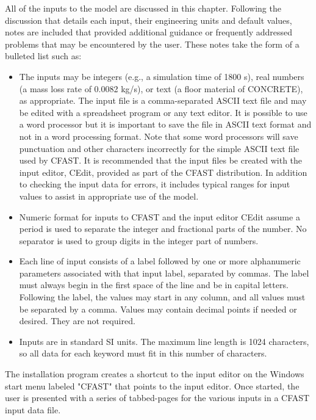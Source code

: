 All of the inputs to the model are discussed in this chapter.  Following the discussion that details each input, their engineering units and default values, notes are included that provided additional guidance or frequently addressed problems that may be encountered by the user. These notes take the form of a bulleted list such as:

\begin{itemize}
\item The inputs may be integers (e.g., a simulation time of 1800 s), real numbers (a mass loss rate of 0.0082 kg/s), or text (a floor material of CONCRETE), as appropriate. The input file is a comma-separated ASCII text file and may be edited with a spreadsheet program or any text editor. It is possible to use a word processor but it is important to save the file in ASCII text format and not in a word processing format. Note that some word processors will save punctuation and other characters incorrectly for the simple ASCII text file used by CFAST. It is recommended that the input files be created with the input editor, CEdit, provided as part of the CFAST distribution.  In addition to checking the input data for errors, it includes typical ranges for input values to assist in appropriate use of the model.

\item Numeric format for inputs to CFAST and the input editor CEdit assume a period is used to separate the integer and fractional parts of the number. No separator is used to group digits in the integer part of numbers.

\item Each line of input consists of a label followed by one or more alphanumeric parameters associated with that input label, separated by commas.  The label must always begin in the first space of the line and be in capital letters.  Following the label, the values may start in any column, and all values must be separated by a comma.  Values may contain decimal points if needed or desired.  They are not required.

\item Inputs are in standard SI units.  The maximum line length is 1024 characters, so all data for each keyword must fit in this number of characters.
\end{itemize}

The installation program creates a shortcut to the input editor on the Windows start menu labeled "CFAST" that points to the input editor.  Once started, the user is presented with a series of tabbed-pages for the various inputs in a CFAST input data file.

